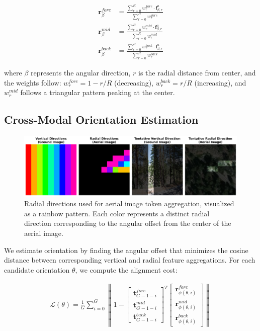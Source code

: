 \documentclass{bmvc2k}
\begin{document}
\begin{align}
\mathbf{r}_\beta^{fore} &= \frac{\sum_{r=0}^{R} w_r^{fore} \cdot \mathbf{f}_{\beta,r}^a}{\sum_{r=0}^{R} w_r^{fore}} \\
\mathbf{r}_\beta^{mid} &= \frac{\sum_{r=0}^{R} w_r^{mid} \cdot \mathbf{f}_{\beta,r}^a}{\sum_{r=0}^{R} w_r^{mid}} \\
\mathbf{r}_\beta^{back} &= \frac{\sum_{r=0}^{R} w_r^{back} \cdot \mathbf{f}_{\beta,r}^a}{\sum_{r=0}^{R} w_r^{back}}
\end{align}

where $\beta$ represents the angular direction, $r$ is the radial distance from center, and the weights follow: $w_r^{fore} = 1-r/R$ (decreasing), $w_r^{back} = r/R$ (increasing), and $w_r^{mid}$ follows a triangular pattern peaking at the center.

\subsection{Cross-Modal Orientation Estimation}

\begin{figure}[t]
    \centering
    \includegraphics[width=0.9\linewidth]{images/rainbow_directions.png}
    \caption{Radial directions used for aerial image token aggregation, visualized as a rainbow pattern. Each color represents a distinct radial direction corresponding to the angular offset from the center of the aerial image.}
    \label{fig:directions}
\end{figure}

We estimate orientation by finding the angular offset that minimizes the cosine distance between corresponding vertical and radial feature aggregations. For each candidate orientation $\theta$, we compute the alignment cost:

\begin{align}
\mathcal{L}(\theta) = \frac{1}{G} \sum_{i=0}^{G} \left\| 1 - \begin{bmatrix} \mathbf{t}_{G-1-i}^{fore} \\ \mathbf{t}_{G-1-i}^{mid} \\ \mathbf{t}_{G-1-i}^{back} \end{bmatrix}^T \begin{bmatrix} \mathbf{r}_{\phi(\theta,i)}^{fore} \\ \mathbf{r}_{\phi(\theta,i)}^{mid} \\ \mathbf{r}_{\phi(\theta,i)}^{back} \end{bmatrix} \right\|
\end{align}
\end{document}
